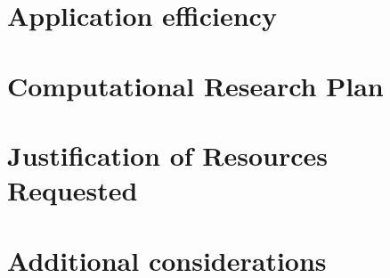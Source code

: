 \documentclass[a4paper, 11pt, notitlepage]{nsf}
\begin{document}
\section{Application efficiency}

% 

\section{Computational Research Plan}
\label{sec:research_plan}


\section{Justification of Resources Requested}


\section{Additional considerations}


%
\newpage


\end{document}
